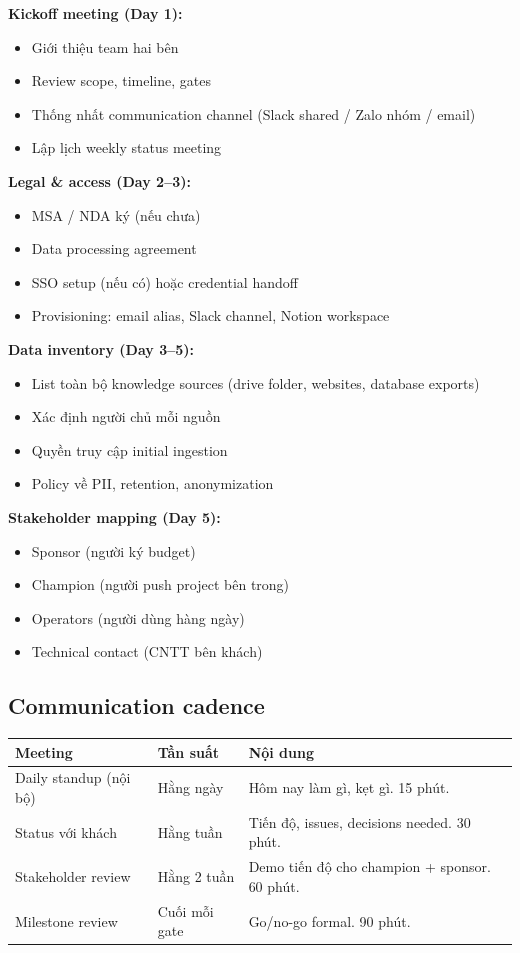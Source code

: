 \documentclass[11pt,a4paper]{article}
\begin{document}
\begin{tpl}[title=Week-1 onboarding checklist]
\textbf{Kickoff meeting (Day 1):}
\begin{itemize}
\item Giới thiệu team hai bên
\item Review scope, timeline, gates
\item Thống nhất communication channel (Slack shared / Zalo nhóm / email)
\item Lập lịch weekly status meeting
\end{itemize}
\textbf{Legal \& access (Day 2--3):}
\begin{itemize}
\item MSA / NDA ký (nếu chưa)
\item Data processing agreement
\item SSO setup (nếu có) hoặc credential handoff
\item Provisioning: email alias, Slack channel, Notion workspace
\end{itemize}
\textbf{Data inventory (Day 3--5):}
\begin{itemize}
\item List toàn bộ knowledge sources (drive folder, websites, database exports)
\item Xác định người chủ mỗi nguồn
\item Quyền truy cập initial ingestion
\item Policy về PII, retention, anonymization
\end{itemize}
\textbf{Stakeholder mapping (Day 5):}
\begin{itemize}
\item Sponsor (người ký budget)
\item Champion (người push project bên trong)
\item Operators (người dùng hàng ngày)
\item Technical contact (CNTT bên khách)
\end{itemize}
\end{tpl}

\subsection{Communication cadence}

\begin{tabularx}{\linewidth}{@{}p{3cm} p{2.5cm} X@{}}
\toprule
\textbf{Meeting} & \textbf{Tần suất} & \textbf{Nội dung} \\
\midrule
Daily standup (nội bộ) & Hằng ngày & Hôm nay làm gì, kẹt gì. 15 phút. \\
Status với khách & Hằng tuần & Tiến độ, issues, decisions needed. 30 phút. \\
Stakeholder review & Hằng 2 tuần & Demo tiến độ cho champion + sponsor. 60 phút. \\
Milestone review & Cuối mỗi gate & Go/no-go formal. 90 phút. \\
\bottomrule
\end{tabularx}
\end{document}
